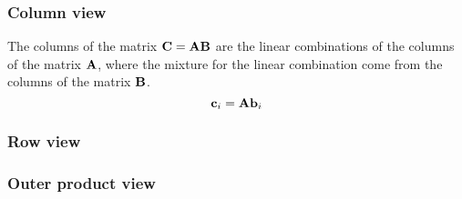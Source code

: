 \subsubsection{Column view}
The columns of the matrix $\mathbf{C} = \mathbf{A}\mathbf{B}$ are the linear combinations of the columns of the matrix $\mathbf{A}$, where the mixture for the linear combination come from the columns of the matrix $\mathbf{B}$.
\begin{equation}
    \mathbf{c}_i = \mathbf{A}\mathbf{b}_i
    \label{eq:ch02-mat-mult-col-view}
\end{equation}


\subsubsection{Row view}

\subsubsection{Outer product view}